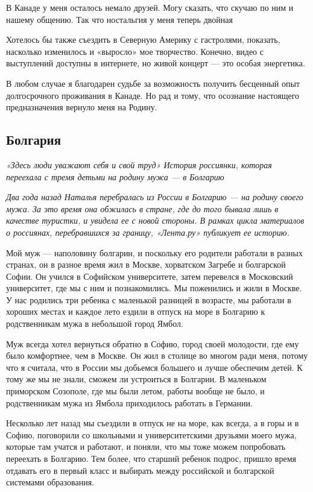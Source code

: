 \begin{fancyquotes}
    В Канаде у меня осталось немало друзей. Могу сказать, что скучаю по ним и нашему общению. Так что ностальгия у меня теперь двойная
\end{fancyquotes}

Хотелось бы также съездить в Северную Америку с гастролями, показать, насколько изменилось и «выросло» мое творчество. Конечно, видео с выступлений доступны в интернете, но живой концерт — это особая энергетика.

В любом случае я благодарен судьбе за возможность получить бесценный опыт долгосрочного проживания в Канаде. Но рад и тому, что осознание настоящего предназначения вернуло меня на Родину.


\newpage
\subsection{Болгария}

\textit{«Здесь люди уважают себя и свой труд» История россиянки, которая переехала с тремя детьми на родину мужа — в Болгарию}

\textit{Два года назад Наталья перебралась из России в Болгарию — на родину своего мужа. За это время она обжилась в стране, где до того бывала лишь в качестве туристки, и увидела ее с новой стороны. В рамках цикла материалов о россиянах, перебравшихся за границу, «Лента.ру» публикует ее историю.}

Мой муж — наполовину болгарин, и поскольку его родители работали в разных странах, он в разное время жил в Москве, хорватском Загребе и болгарской Софии. Он учился в Софийском университете, затем перевелся в Московский университет, где мы с ним и познакомились. Мы поженились и жили в Москве. У нас родились три ребенка с маленькой разницей в возрасте, мы работали в хороших местах и каждое лето ездили в отпуск на море в Болгарию к родственникам мужа в небольшой город Ямбол.

Муж всегда хотел вернуться обратно в Софию, город своей молодости, где ему было комфортнее, чем в Москве. Он жил в столице во многом ради меня, потому что я считала, что в России мы добьемся большего и лучше обеспечим детей. К тому же мы не знали, сможем ли устроиться в Болгарии. В маленьком приморском Созополе, где мы были летом, работы вообще не было, и родственникам мужа из Ямбола приходилось работать в Германии.

Несколько лет назад мы съездили в отпуск не на море, как всегда, а в горы и в Софию, поговорили со школьными и университетскими друзьями моего мужа, которые там учатся и работают, и поняли, что мы тоже можем попробовать переехать в Болгарию. Тем более, что старший ребенок подрос, пришло время отдавать его в первый класс и выбирать между российской и болгарской системами образования.

